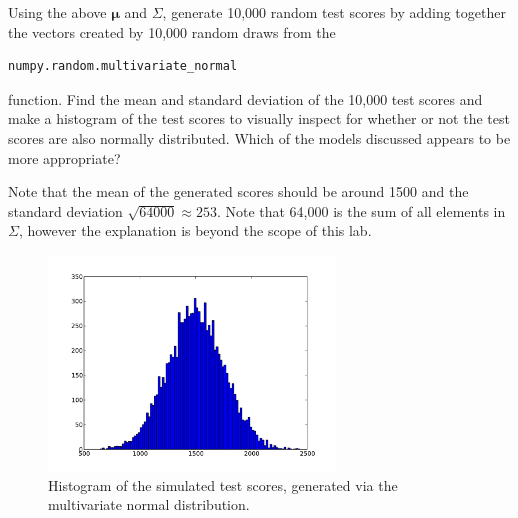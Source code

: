 \begin{problem}
Using the above $\mathbf{\mu}$ and $\Sigma$, generate 10,000 random test scores by adding together the vectors created by 10,000 random draws from the \begin{verbatim}numpy.random.multivariate_normal \end{verbatim} function. Find the mean and standard deviation of the 10,000 test scores and make a histogram of the test scores to visually inspect for whether or not the test scores are also normally distributed. Which of the models discussed appears to be more appropriate?
\end{problem}

Note that the mean of the generated scores should be around 1500 and the standard deviation $\sqrt{64000} \approx 253$. Note that 64,000 is the sum of all elements in $\Sigma$, however the explanation is beyond the scope of this lab. 

\begin{figure}
\centering
\includegraphics[width=3in]{scorehist-mvn.pdf}
\caption{Histogram of the simulated test scores, generated via the multivariate normal distribution.}
\end{figure}

